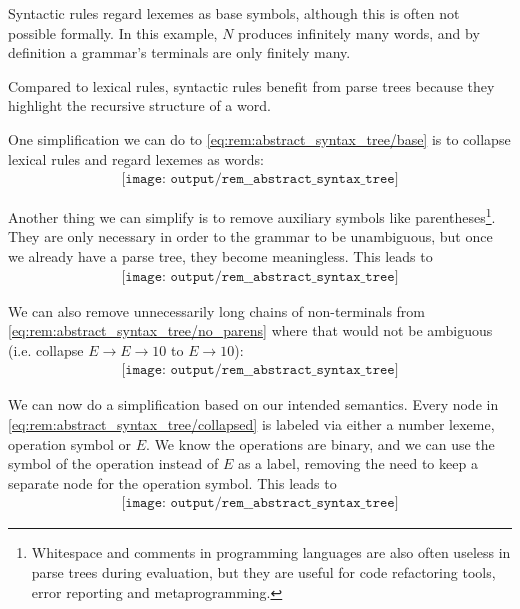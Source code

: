 \begin{remark}
\begin{thmenum}
    Syntactic rules regard lexemes as base symbols, although this is often not possible formally. In this example, \( N \) produces infinitely many words, and by definition a grammar's terminals are only finitely many.

    Compared to lexical rules, syntactic rules benefit from parse trees because they highlight the recursive structure of a word.
  \end{thmenum}

  One simplification we can do to \eqref{eq:rem:abstract_syntax_tree/base} is to collapse lexical rules and regard lexemes as words:
  \begin{equation}\label{eq:rem:abstract_syntax_tree/syntactic}
    \begin{aligned}
      \texttt{[image: output/rem\_\_abstract\_syntax\_tree]}
    \end{aligned}
  \end{equation}

  Another thing we can simplify is to remove auxiliary symbols like parentheses\footnote{Whitespace and comments in programming languages are also often useless in parse trees during evaluation, but they are useful for code refactoring tools, error reporting and metaprogramming.}. They are only necessary in order to the grammar to be unambiguous, but once we already have a parse tree, they become meaningless. This leads to
  \begin{equation}\label{eq:rem:abstract_syntax_tree/no_parens}
    \begin{aligned}
      \texttt{[image: output/rem\_\_abstract\_syntax\_tree]}
    \end{aligned}
  \end{equation}

  We can also remove unnecessarily long chains of non-terminals from \eqref{eq:rem:abstract_syntax_tree/no_parens} where that would not be ambiguous (i.e. collapse \( E \to E \to 10 \) to \( E \to 10 \)):
  \begin{equation}\label{eq:rem:abstract_syntax_tree/collapsed}
    \begin{aligned}
      \texttt{[image: output/rem\_\_abstract\_syntax\_tree]}
    \end{aligned}
  \end{equation}

  We can now do a simplification based on our intended semantics. Every node in \eqref{eq:rem:abstract_syntax_tree/collapsed} is labeled via either a number lexeme, operation symbol or \( E \). We know the operations are binary, and we can use the symbol of the operation instead of \( E \) as a label, removing the need to keep a separate node for the operation symbol. This leads to
  \begin{equation}\label{eq:rem:abstract_syntax_tree/final}
    \begin{aligned}
      \texttt{[image: output/rem\_\_abstract\_syntax\_tree]}
    \end{aligned}
  \end{equation}


\end{remark}
